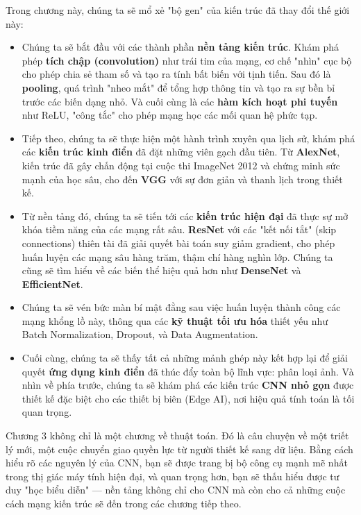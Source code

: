 Trong chương này, chúng ta sẽ mổ xẻ "bộ gen" của kiến trúc đã thay đổi thế giới này:
\begin{itemize}
	\item Chúng ta sẽ bắt đầu với các thành phần \textbf{nền tảng kiến trúc}. Khám phá phép \textbf{tích chập (convolution)} như trái tim của mạng, cơ chế "nhìn" cục bộ cho phép chia sẻ tham số và tạo ra tính bất biến với tịnh tiến. Sau đó là \textbf{pooling}, quá trình "nheo mắt" để tổng hợp thông tin và tạo ra sự bền bỉ trước các biến dạng nhỏ. Và cuối cùng là các \textbf{hàm kích hoạt phi tuyến} như ReLU, "công tắc" cho phép mạng học các mối quan hệ phức tạp.
	
	\item Tiếp theo, chúng ta sẽ thực hiện một hành trình xuyên qua lịch sử, khám phá các \textbf{kiến trúc kinh điển} đã đặt những viên gạch đầu tiên. Từ \textbf{AlexNet}, kiến trúc đã gây chấn động tại cuộc thi ImageNet 2012 và chứng minh sức mạnh của học sâu, cho đến \textbf{VGG} với sự đơn giản và thanh lịch trong thiết kế.
	
	\item Từ nền tảng đó, chúng ta sẽ tiến tới các \textbf{kiến trúc hiện đại} đã thực sự mở khóa tiềm năng của các mạng rất sâu. \textbf{ResNet} với các "kết nối tắt" (skip connections) thiên tài đã giải quyết bài toán suy giảm gradient, cho phép huấn luyện các mạng sâu hàng trăm, thậm chí hàng nghìn lớp. Chúng ta cũng sẽ tìm hiểu về các biến thể hiệu quả hơn như \textbf{DenseNet} và \textbf{EfficientNet}.
	
	\item Chúng ta sẽ vén bức màn bí mật đằng sau việc huấn luyện thành công các mạng khổng lồ này, thông qua các \textbf{kỹ thuật tối ưu hóa} thiết yếu như Batch Normalization, Dropout, và Data Augmentation.
	
	\item Cuối cùng, chúng ta sẽ thấy tất cả những mảnh ghép này kết hợp lại để giải quyết \textbf{ứng dụng kinh điển} đã thúc đẩy toàn bộ lĩnh vực: phân loại ảnh. Và nhìn về phía trước, chúng ta sẽ khám phá các kiến trúc \textbf{CNN nhỏ gọn} được thiết kế đặc biệt cho các thiết bị biên (Edge AI), nơi hiệu quả tính toán là tối quan trọng.
\end{itemize}

Chương 3 không chỉ là một chương về thuật toán. Đó là câu chuyện về một triết lý mới, một cuộc chuyển giao quyền lực từ người thiết kế sang dữ liệu. Bằng cách hiểu rõ các nguyên lý của CNN, bạn sẽ được trang bị bộ công cụ mạnh mẽ nhất trong thị giác máy tính hiện đại, và quan trọng hơn, bạn sẽ thấu hiểu được tư duy "học biểu diễn" — nền tảng không chỉ cho CNN mà còn cho cả những cuộc cách mạng kiến trúc sẽ đến trong các chương tiếp theo.
